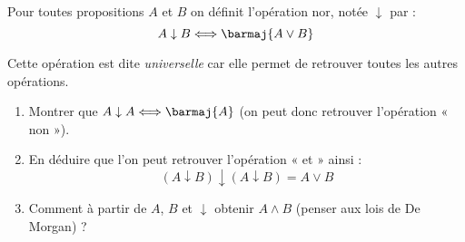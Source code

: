 \documentclass[a4paper,12pt]{article}
\begin{document}
Pour toutes propositions $A$ et $B$ on définit l'opération \og nor\fg{}, notée $\downarrow$ par : $$A\downarrow B \Longleftrightarrow\barmaj{A\vee B}$$

Cette opération est dite \textit{universelle} car elle permet de retrouver toutes les autres opérations.

\begin{enumerate}[\bfseries 1.]
	\item 	Montrer que $A\downarrow A \Longleftrightarrow \barmaj{A}$ (on peut donc retrouver l'opération « non »).
	\item 	En déduire que l'on peut retrouver l'opération « et » ainsi : $$(A\downarrow B)\downarrow(A\downarrow B) = A\vee B$$ 
	\item 	Comment à partir de $A$, $B$ et $\downarrow$ obtenir $A\wedge B$ (penser aux lois de De Morgan) ?
\end{enumerate}
\end{document}

